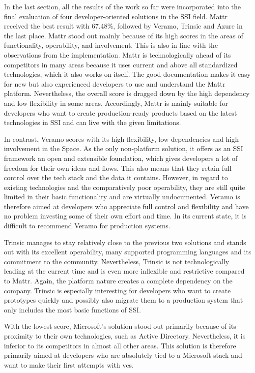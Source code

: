     In the last section, all the results of the work so far were incorporated into the final evaluation of four developer-oriented solutions in the \ac{SSI} field. Mattr received the best result with 67.48\%, followed by Veramo, Trinsic and Azure in the last place. Mattr stood out mainly because of its high scores in the areas of functionality, operability, and involvement. This is also in line with the observations from the implementation. Mattr is technologically ahead of its competitors in many areas because it uses current and above all standardized technologies, which it also works on itself. The good documentation makes it easy for new but also experienced developers to use and understand the Mattr platform. Nevertheless, the overall score is dragged down by the high dependency and low flexibility in some areas. Accordingly, Mattr is mainly suitable for developers who want to create production-ready products based on the latest technologies in \ac{SSI} and can live with the given limitations.

    In contrast, Veramo scores with its high flexibility, low dependencies and high involvement in the Space. As the only non-platform solution, it offers as an \ac{SSI} framework an open and extensible foundation, which gives developers a lot of freedom for their own ideas and flows. This also means that they retain full control over the tech stack and the data it contains. However, in regard to existing technologies and the comparatively poor operability, they are still quite limited in their basic functionality and are virtually undocumented. Veramo is therefore aimed at developers who appreciate full control and flexibility and have no problem investing some of their own effort and time. In its current state, it is difficult to recommend Veramo for production systems.

    Trinsic manages to stay relatively close to the previous two solutions and stands out with its excellent operability, many supported programming languages and its commitment to the community. Nevertheless, Trinsic is not technologically leading at the current time and is even more inflexible and restrictive compared to Mattr. Again, the platform nature creates a complete dependency on the company. Trinsic is especially interesting for developers who want to create prototypes quickly and possibly also migrate them to a production system that only includes the most basic functions of \ac{SSI}.
    
    With the lowest score, Microsoft's solution stood out primarily because of its proximity to their own technologies, such as Active Directory. Nevertheless, it is inferior to its competitors in almost all other areas. This solution is therefore primarily aimed at developers who are absolutely tied to a Microsoft stack and want to make their first attempts with \acp{vc}.
    

